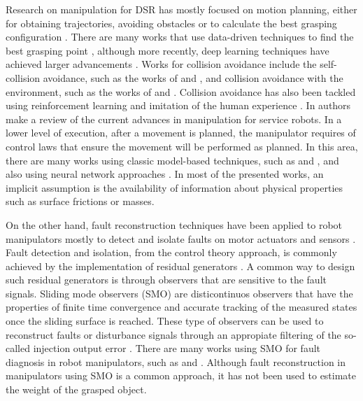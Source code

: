 \documentclass[conference,letterpaper]{ieeeconf}
\begin{document}
Research on manipulation for DSR has mostly focused on motion planning, either for obtaining trajectories, avoiding obstacles or to calculate the best grasping configuration \cite{billard_trends_2019}. There are many works that use data-driven techniques to find the best grasping point \cite{bohg2013data,sahbani2012overview}, although more recently, deep learning techniques have achieved larger advancements \cite{nguyen_review_2019}. Works for collision avoidance include the self-collision avoidance, such as the works of \cite{mirrazavi2018unified} and \cite{rakita2018relaxedik}, and collision avoidance with the environment, such as the works of \cite{di2017real} and \cite{nikou2017nonlinear}. Collision avoidance has also been tackled using reinforcement learning \cite{yamada2020motion} and imitation of the human experience \cite{huang2020real}. In \cite{hamidreza2020state} authors make a review of the current advances in manipulation for service robots. In a lower level of execution, after a movement is planned, the manipulator requires of control laws that ensure the movement will be performed as planned. In this area, there are many works using classic model-based techniques, such as \cite{varela2018modelling,seo2018dual,lee2017adaptive} and \cite{han2017assumed}, and also using neural network approaches \cite{jin2018robot, khan2020tracking, jin2021robust}. In most of the presented works, an implicit assumption is the availability of information about physical properties such as surface frictions or masses. 

On the other hand, fault reconstruction techniques have been applied to robot manipulators mostly to detect and isolate faults on motor actuators and sensors \cite{omali2019nonlinear, cordoneanu2018review, zhang2020review}. Fault detection and isolation, from the control theory approach, is commonly achieved by the implementation of residual generators \cite{abid2020review}. A common way to design such residual generators is through observers that are sensitive to the fault signals. Sliding mode observers (SMO) are disticontinuos observers that have the properties of finite time convergence and accurate tracking of the measured states once the sliding surface is reached. These type of observers can be used to reconstruct faults or disturbance signals through an appropiate filtering of the so-called injection output error \cite{shtessel2014sliding,davila2006observation}. There are many works using SMO for fault diagnosis in robot manipulators, such as \cite{capisani2012manipulator, sun2017protective} and \cite{ferrara2020sliding}. Although fault reconstruction in manipulators using SMO is a common approach, it has not been used to estimate the weight of the grasped object.
\end{document}
